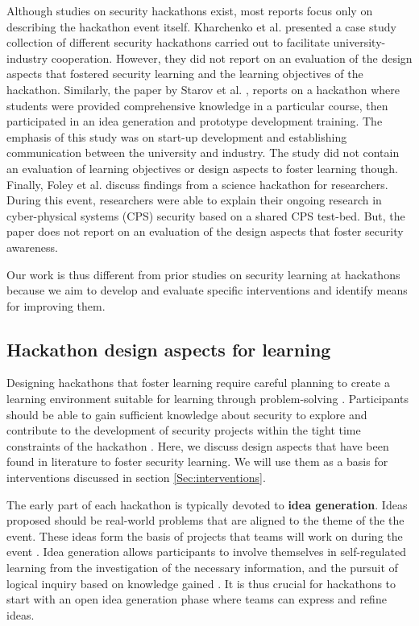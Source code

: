 \documentclass[runningheads]{llncs}
\begin{document}
Although studies on security hackathons exist, most reports focus only on describing the hackathon event itself.
Kharchenko et al. \cite{kharchenko2016university} presented a case study collection of different security hackathons carried out to facilitate university-industry cooperation. 
However, they did not report on an evaluation of the design aspects that fostered security learning and the learning objectives of the hackathon. Similarly, the paper by Starov et al. \cite{starov2015hacking}, reports on a hackathon where students were provided comprehensive knowledge in a particular course, then participated in an idea generation and prototype development training.
The emphasis of this study was on start-up development and establishing communication between the university and industry. The study did not contain an evaluation of learning objectives or design aspects to foster learning though. Finally, Foley et al. \cite{foley2018science} discuss findings from a science hackathon for researchers. During this event, researchers were able to explain their ongoing research in cyber-physical systems (CPS) security based on a shared CPS test-bed.
But, the paper does not report on an evaluation of the design aspects that foster security awareness.

Our work is thus different from prior studies on security learning at hackathons because we aim to develop and evaluate specific interventions and identify means for improving them.

\subsection{Hackathon design aspects for learning}\label{Sec:designaspects}
Designing hackathons that foster learning require careful planning to create a learning environment suitable for learning through problem-solving \cite{case2004between}. Participants should be able to gain sufficient knowledge about security to explore and contribute to the development of security projects within the tight time constraints of the hackathon \cite{kollwitz2019hack}.
Here, we discuss design aspects that have been found in literature to foster security learning. We will use them as a basis for interventions discussed in section \ref{Sec:interventions}.

The early part of each hackathon is typically devoted to \textbf{idea generation}. Ideas proposed should be real-world problems that are aligned to the theme of the the event. These ideas form the basis of projects that teams will work on during the event \cite{stoyanov2007effect}. Idea generation allows participants to involve themselves in self-regulated learning from the investigation of the necessary information, and the pursuit of logical inquiry based on knowledge gained \cite{akcay2009problem}. 
It is thus crucial for hackathons to start with an open idea generation phase \cite{bohmer2015open} where teams can express and refine ideas. 
\end{document}
